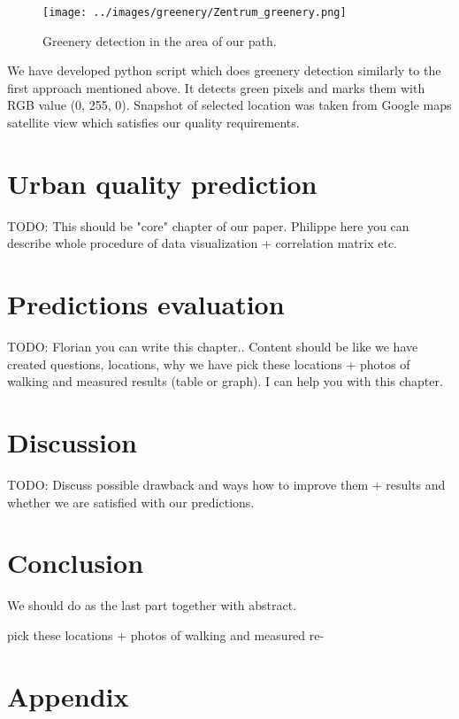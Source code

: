 \documentclass[letterpaper]{article}
\begin{document}
  \begin{figure}
 	\centering
 	\texttt{[image: ../images/greenery/Zentrum\_greenery.png]}
 	\caption{Greenery detection in the area of our path.}
 	\label{fig:path_greenery}
 \end{figure}

\indent We have developed python script which does greenery detection similarly to the first approach mentioned above. It detects green pixels and marks them with RGB value (0, 255, 0). Snapshot of selected location was taken from Google maps satellite view which satisfies our quality requirements.  %

\section{Urban quality prediction}
TODO: This should be "core" chapter of our paper. Philippe here you can describe whole procedure of data visualization + correlation matrix etc.

\section{Predictions evaluation}\label{sec:exp}
TODO: Florian you can write this chapter.. Content should be like we have created questions, locations, why we have pick these locations + photos
of walking and measured results (table or graph). I can help you with this chapter.

\section{Discussion}\label{sec:discussion}
TODO: Discuss possible drawback and ways how to improve them + results and whether we are satisfied with our predictions.

\section{Conclusion}\label{sec:conclusion}
We should do as the last part together with abstract.



pick these locations + photos of walking and measured re-

\newpage
\section{Appendix}
\end{document}
